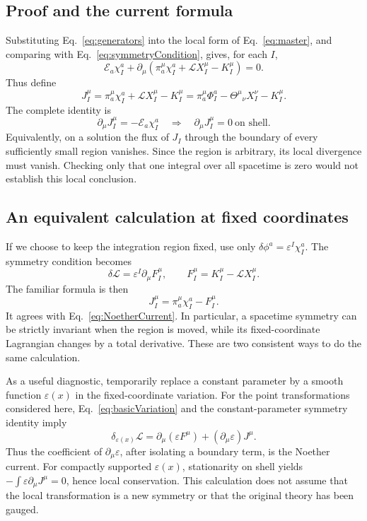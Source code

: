 \documentclass[11pt]{article}
\newcommand{\Lag}{\mathcal{L}}
\newcommand{\Th}{\Theta}
\newcommand{\Eul}{\mathcal E}
\begin{document}
\subsection{Proof and the current formula}
Substituting Eq.~\eqref{eq:generators} into the local form of
Eq.~\eqref{eq:master}, and comparing with Eq.~\eqref{eq:symmetryCondition},
gives, for each \(I\),
\begin{equation}
\Eul_a\chi_I^a+
\partial_\mu\left(\pi_a^\mu\chi_I^a+\Lag X_I^\mu-K_I^\mu\right)=0.
\end{equation}
Thus define
\begin{equation}
\boxed{J_I^\mu
=\pi_a^\mu\chi_I^a+\Lag X_I^\mu-K_I^\mu
=\pi_a^\mu\Phi_I^a-\Th^\mu{}_{\nu}X_I^\nu-K_I^\mu.}
\label{eq:NoetherCurrent}
\end{equation}
The complete identity is
\begin{equation}
\boxed{\partial_\mu J_I^\mu=-\Eul_a\chi_I^a
\quad\Longrightarrow\quad\partial_\mu J_I^\mu=0\ \text{on shell}.}
\label{eq:NoetherIdentity}
\end{equation}
Equivalently, on a solution the flux of \(J_I\) through the boundary of
every sufficiently small region vanishes. Since the region is arbitrary,
its local divergence must vanish. Checking only that one integral over
all spacetime is zero would not establish this local conclusion.

\subsection{An equivalent calculation at fixed coordinates}
If we choose to keep the integration region fixed, use only
\(\delta\phi^a=\varepsilon^I\chi_I^a\). The symmetry condition becomes
\begin{equation}
\delta\Lag=\varepsilon^I\partial_\mu F_I^\mu,
\qquad F_I^\mu=K_I^\mu-\Lag X_I^\mu.
\end{equation}
The familiar formula is then
\begin{equation}
J_I^\mu=\pi_a^\mu\chi_I^a-F_I^\mu.
\end{equation}
It agrees with Eq.~\eqref{eq:NoetherCurrent}. In particular, a spacetime
symmetry can be strictly invariant when the region is moved, while its
fixed-coordinate Lagrangian changes by a total derivative. These are two
consistent ways to do the same calculation.

As a useful diagnostic, temporarily replace a constant parameter by a
smooth function \(\varepsilon(x)\) in the fixed-coordinate variation.
For the point transformations considered here, Eq.~\eqref{eq:basicVariation}
and the constant-parameter symmetry identity imply
\begin{equation}
\delta_{\varepsilon(x)}\Lag
=\partial_\mu(\varepsilon F^\mu)
+(\partial_\mu\varepsilon)J^\mu.
\label{eq:localParameter}
\end{equation}
Thus the coefficient of \(\partial_\mu\varepsilon\), after isolating a
boundary term, is the Noether current. For compactly supported
\(\varepsilon(x)\), stationarity on shell yields
\(-\int\varepsilon\partial_\mu J^\mu=0\), hence local conservation.
This calculation does not assume that the local transformation is a new
symmetry or that the original theory has been gauged.
\end{document}
